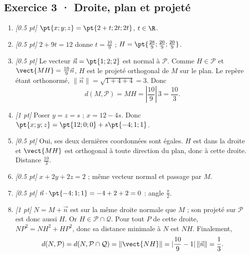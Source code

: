 \subsection*{Exercice 3 · Droite, plan et projeté}\begin{enumerate}

\item \textit{[\num{0,5} pt]} $\pt{x;y;z}=\pt{2+t;2t;2t}$, $t\in\R$.

\item \textit{[\num{0,5} pt]} $2+9t=12$ donne $t=\frac{10}{9}$ ; $H=\pt{\frac{28}{9};\frac{20}{9};\frac{20}{9}}$.

\item \textit{[\num{0,5} pt]} Le vecteur $\vec n=\pt{1;2;2}$ est normal à $\mathcal P$. Comme $H\in\mathcal P$ et $\vect{MH}=\frac{10}{9}\vec n$, $H$ est le projeté orthogonal de $M$ sur le plan. Le repère étant orthonormé, $\|\vec n\|=\sqrt{1+4+4}=3$. Donc
\[d(M,\mathcal P)=MH=|\frac{10}{9}|\,3=\frac{10}{3}.\]

\item \textit{[1 pt]} Poser $y=z=s$ ; $x=12-4s$. Donc $\pt{x;y;z}=\pt{12;0;0}+s\pt{-4;1;1}$.

\item \textit{[\num{0,5} pt]} Oui, ses deux dernières coordonnées sont égales. $H$ est dans la droite et $\vect{MH}$ est orthogonal à toute direction du plan, donc à cette droite. Distance $\frac{10}{3}$.

\item \textit{[\num{0,5} pt]} $x+2y+2z=2$ ; même vecteur normal et passage par $M$.

\item \textit{[\num{0,5} pt]} $\vec n\cdot\pt{-4;1;1}=-4+2+2=0$ : angle $\frac{\pi}{2}$.

\item \textit{[1 pt]} $N=M+\vec n$ est sur la même droite normale que $M$ ; son projeté sur $\mathcal P$ est donc aussi $H$. Or $H\in\mathcal P\cap\mathcal Q$. Pour tout $P$ de cette droite, $NP^2=NH^2+HP^2$, donc sa distance minimale à $N$ est $NH$. Finalement,
\[d(N,\mathcal P)=d(N,\mathcal P\cap\mathcal Q)=\|\vect{NH}\|=|\frac{10}{9}-1|\,\|\vec n\|=\frac{1}{3}.\]

\end{enumerate}

